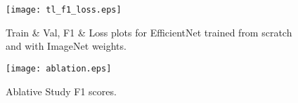 \documentclass[10pt,twocolumn,letterpaper]{article}
\begin{document}
\begin{figure}[t]
  \centering
  \texttt{[image: tl\_f1\_loss.eps]}  
   \caption{Train \& Val, F1 \& Loss plots for EfficientNet trained from scratch and with ImageNet weights.}
   \vspace{-1em}
   \label{fig:tl_acc_loss}
\end{figure}


\begin{figure}[t]
  \centering
  \texttt{[image: ablation.eps]}  
   \caption{Ablative Study F1 scores.}
   \vspace{-1em}
   \label{fig:ablation}
\end{figure}

\clearpage
{\small


}
\end{document}
